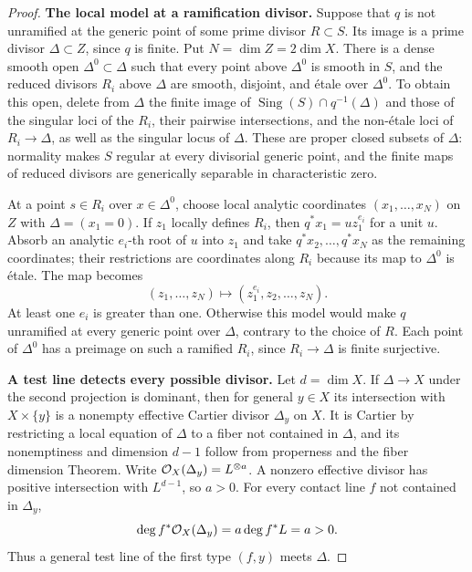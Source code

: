 \begin{proof}
\medskip
\noindent\textbf{The local model at a ramification divisor.}
Suppose that $q$ is not unramified at the generic point of some
prime divisor $R\subset S$. Its image is a prime divisor
$\Delta\subset Z$, since $q$ is finite. Put $N=\dim Z=2\dim X$.
There is a dense smooth open $\Delta^0\subset\Delta$ such that every
point above $\Delta^0$ is smooth in $S$, and the reduced divisors
$R_i$ above $\Delta$ are smooth, disjoint, and \'etale over
$\Delta^0$. To obtain this open, delete from $\Delta$ the finite image
of $\operatorname{Sing}(S)\cap q^{-1}(\Delta)$ and those of the
singular loci of the $R_i$, their pairwise intersections, and the
non-\'etale loci of $R_i\to\Delta$, as well as the singular locus
of $\Delta$. These are proper closed subsets
of $\Delta$: normality makes $S$ regular at every divisorial generic
point, and the finite maps of reduced divisors are generically
separable in characteristic zero.

At a point $s\in R_i$ over $x\in\Delta^0$, choose local analytic
coordinates $(x_1,\ldots,x_N)$ on $Z$ with $\Delta=(x_1=0)$.
If $z_1$ locally defines $R_i$, then
$q^*x_1=u z_1^{e_i}$ for a unit $u$. Absorb an analytic $e_i$-th
root of $u$ into $z_1$ and take $q^*x_2,\ldots,q^*x_N$ as the
remaining coordinates; their restrictions are coordinates along
$R_i$ because its map to $\Delta^0$ is \'etale. The map becomes
\begin{equation}\label{des:branch-model}
(z_1,\ldots,z_N)\longmapsto
(z_1^{e_i},z_2,\ldots,z_N).
\end{equation}
At least one $e_i$ is greater than one. Otherwise this model would
make $q$ unramified at every generic point over $\Delta$, contrary
to the choice of $R$. Each point of $\Delta^0$ has a preimage on
such a ramified $R_i$, since $R_i\to\Delta$ is finite surjective.

\medskip
\noindent\textbf{A test line detects every possible divisor.}
Let $d=\dim X$. If $\Delta\to X$ under the second projection is
dominant, then for general $y\in X$ its intersection with
$X\times\{y\}$ is a nonempty effective Cartier divisor
$\Delta_y$ on $X$. It is Cartier by restricting a local equation of
$\Delta$ to a fiber not contained in $\Delta$, and its nonemptiness
and dimension $d-1$ follow from properness and the fiber dimension
Theorem. Write $\mathcal O_X(\Delta_y)=L^{\otimes a}$. A nonzero effective
divisor has positive intersection with $L^{d-1}$, so $a>0$.
For every contact line $f$ not contained in $\Delta_y$,
\[
\deg f^*\mathcal O_X(\Delta_y)=a\deg f^*L=a>0.
\]
Thus a general test line of the first type $(f,y)$ meets $\Delta$.


\end{proof}
